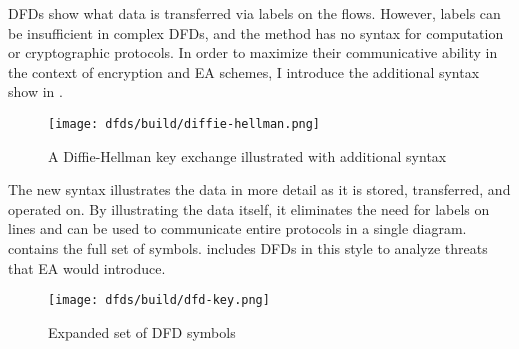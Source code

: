 \Acp{DFD} show what data is transferred via labels on the flows. However, labels can be insufficient in complex
\acp{DFD}, and the method has no syntax for computation or cryptographic protocols. In order to maximize their
communicative ability in the context of encryption and \acl{EA} schemes, I introduce the additional syntax show in
.

\begin{figure}[h]
    \centering\CaptionFontSize
    \texttt{[image: dfds/build/diffie-hellman.png]}
    \caption{A Diffie-Hellman key exchange illustrated with additional syntax}
    \label{fig-dfd-dh-updated}
\end{figure}

The new syntax illustrates the data in more detail as it is stored, transferred, and operated on. By illustrating the
data itself, it eliminates the need for labels on lines and can be used to communicate entire protocols in a single
diagram.  contains the full set of symbols.  includes \acp{DFD} in this
style to analyze threats that EA would introduce.

\begin{figure}[h]
    \centering\CaptionFontSize
    \texttt{[image: dfds/build/dfd-key.png]}
    \caption{Expanded set of DFD symbols}
    \label{fig-dfd-key}
\end{figure}
